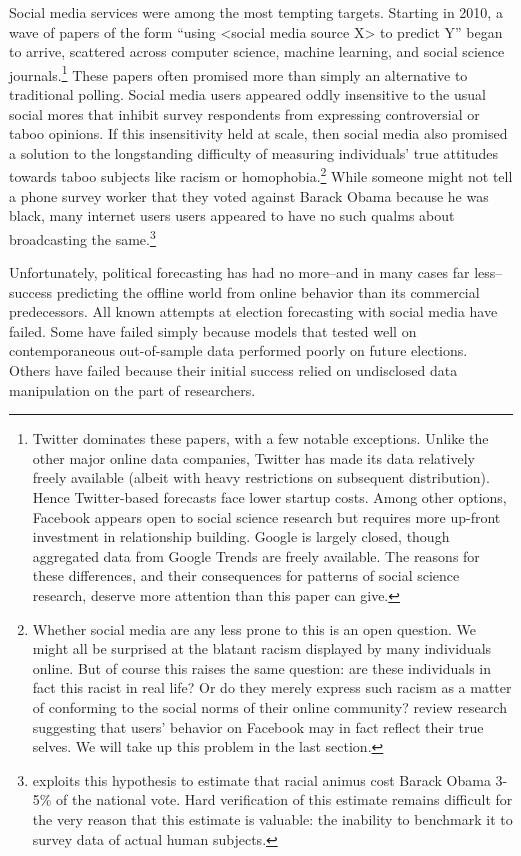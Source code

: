 \documentclass{article}
\begin{document}
Social media services were among the most tempting
targets. Starting in 2010, a wave of papers of the form ``using
<social media source X> to predict Y'' began to
arrive, scattered across computer science, machine learning, and
social science journals.\footnote{Twitter dominates these papers, with a few notable
  exceptions. Unlike the other major online data companies, Twitter has made
  its data relatively freely available (albeit with heavy restrictions
  on subsequent distribution). Hence Twitter-based forecasts face
  lower startup costs. Among other options, Facebook appears open to
  social science research but requires more up-front investment in
  relationship building. Google is largely closed, though aggregated
  data from Google Trends are freely available. The reasons for these
  differences, and their consequences for patterns of social science
  research, deserve more attention than this paper can give.}
These papers often promised more than simply an
alternative to traditional polling. Social media users appeared oddly
insensitive to the usual social mores that inhibit survey respondents from expressing
controversial or taboo opinions. If this insensitivity held at scale, then social
media also promised a solution to the longstanding
difficulty of measuring individuals' true attitudes towards taboo
subjects like racism or homophobia.\footnote{Whether social media are any less prone to this
is an open question. We might all be surprised at the blatant racism
displayed by many individuals online. But of course this raises the
same question: are these individuals in fact this racist in real life?
Or do they merely express such racism as a matter of conforming to the
social norms of their online community? \cite{wilson2012review}
review research suggesting that users' behavior on Facebook may in
fact reflect their true selves.  We will take up this problem
in the last section.}  While someone might not tell a phone survey worker that they
voted against Barack Obama because he was black, many internet users
users appeared to have no such qualms about broadcasting the
same.\footnote{\cite{stephens2013cost} exploits this hypothesis to
  estimate that racial animus cost Barack Obama 3-5\% of the national
  vote. Hard verification of this estimate remains difficult for the
  very reason that this estimate is valuable: the inability to
  benchmark it to survey data of actual human subjects.}

Unfortunately, political forecasting has had no more--and in many
cases far less--success predicting the offline world from online
behavior than its commercial predecessors. All known
attempts at election forecasting with social media have failed. Some
have failed simply because models that tested well on contemporaneous
out-of-sample data performed poorly on future elections. Others have
failed because their initial success relied on undisclosed data
manipulation on the part of researchers.
\end{document}
